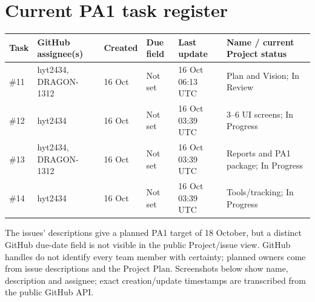 \section{Current PA1 task register}
\small
\begin{longtable}{p{1.0cm}p{3.0cm}p{2.0cm}p{1.7cm}p{2.1cm}p{3.2cm}}
\toprule Task & GitHub assignee(s) & Created & Due field & Last update & Name / current Project status \\ \midrule
\#11 & hyt2434, DRAGON-1312 & 16 Oct & Not set & 16 Oct 06:13 UTC & Plan and Vision; In Review \\ 
\#12 & hyt2434 & 16 Oct & Not set & 16 Oct 03:39 UTC & 3--6 UI screens; In Progress \\ 
\#13 & hyt2434, DRAGON-1312 & 16 Oct & Not set & 16 Oct 03:39 UTC & Reports and PA1 package; In Progress \\ 
\#14 & hyt2434 & 16 Oct & Not set & 16 Oct 03:39 UTC & Tools/tracking; In Progress \\ \bottomrule
\end{longtable}
\normalsize
The issues' descriptions give a planned PA1 target of 18 October, but a distinct GitHub due-date field is not visible in the public Project/issue view. GitHub handles do not identify every team member with certainty; planned owners come from issue descriptions and the Project Plan. Screenshots below show name, description and assignee; exact creation/update timestamps are transcribed from the public GitHub API.

